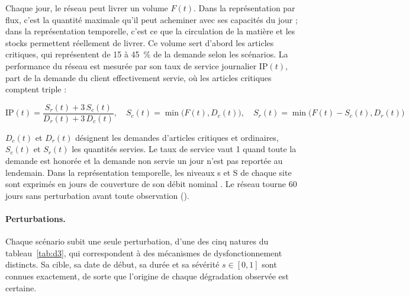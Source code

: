 Chaque jour, le réseau peut livrer un volume $F(t)$. Dans la représentation par flux, c'est la quantité maximale qu'il peut acheminer avec ses capacités du jour ; dans la représentation temporelle, c'est ce que la circulation de la matière et les stocks permettent réellement de livrer. Ce volume sert d'abord les articles critiques, qui représentent de 15 à 45~\% de la demande selon les scénarios. La performance du réseau est mesurée par son taux de service journalier $\mathrm{IP}(t)$, part de la demande du client effectivement servie, où les articles critiques comptent triple :

\begin{equation}
\mathrm{IP}(t) = \frac{S_r(t) + 3\,S_c(t)}{D_r(t) + 3\,D_c(t)}, \quad S_c(t) = \min\big(F(t), D_c(t)\big), \quad S_r(t) = \min\big(F(t) - S_c(t), D_r(t)\big)
\label{eq:1}
\end{equation}

$D_{c}(t)$ et $D_{r}(t)$ désignent les demandes d'articles critiques et ordinaires, $S_{c}(t)$ et $S_{r}(t)$ les quantités servies. Le taux de service vaut 1 quand toute la demande est honorée et la demande non servie un jour n'est pas reportée au lendemain. Dans la représentation temporelle, les niveaux s et S de chaque site sont exprimés en jours de couverture de son débit nominal \citep{scarf1960, little1961}. Le réseau tourne 60 jours sans perturbation avant toute observation ().

\paragraph{Perturbations.} Chaque scénario subit une seule perturbation, d'une des cinq natures du tableau~\ref{tab:d3}, qui correspondent à des mécanismes de dysfonctionnement distincts. Sa cible, sa date de début, sa durée et sa sévérité $s \in [0,1]$ sont connues exactement, de sorte que l'origine de chaque dégradation observée est certaine.\\

